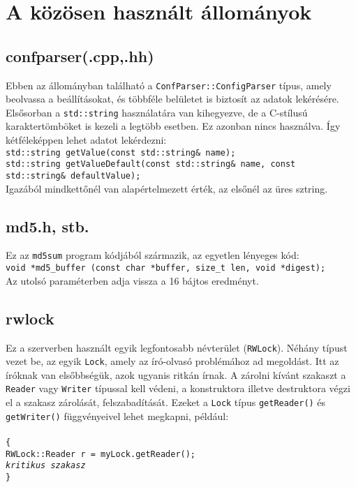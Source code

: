 \documentclass[fleqn,10pt,a4paper,titlepage]{article}
\begin{document}
  \section{A közösen használt állományok}
  
  \subsection{confparser(.cpp,.hh)}
  Ebben az állományban található a \texttt{ConfParser::ConfigParser} típus, amely beolvassa a beállításokat, és többféle
  belületet is biztosít az adatok lekérésére. Elsősorban a \texttt{std::string} használatára van kihegyezve, de a
  C-stílusú karaktertömböket is kezeli a legtöbb esetben. Ez azonban nincs használva. Így kétféleképpen lehet adatot
  lekérdezni:\\
  \texttt{std::string getValue(const std::string\& name);\\
    std::string getValueDefault(const std::string\& name, const std::string\& defaultValue);\\
  }
  Igazából mindkettőnél van alapértelmezett érték, az elsőnél az üres sztring.
  
  \subsection{md5.h, stb.}
  Ez az \texttt{md5sum} program kódjából származik, az egyetlen lényeges kód:\\
  \texttt{void *md5\_buffer (const char *buffer, size\_t len, void *digest);}\\
  Az utolsó paraméterben adja vissza a 16 bájtos eredményt.

  \subsection{rwlock}
  Ez a szerverben használt egyik legfontosabb névterület (\texttt{RWLock}). Néhány típust vezet be, az egyik
  \texttt{Lock}, amely az író-olvasó problémához ad megoldást. Itt az íróknak van elsőbbségük, azok ugyanis ritkán
  írnak.
  A zárolni kívánt szakaszt a \texttt{Reader} vagy \texttt{Writer} típussal kell védeni, a konstruktora illetve
  destruktora végzi el a szakasz zárolását, felszabadítását. Ezeket a \texttt{Lock} típus \texttt{getReader()} és
  \texttt{getWriter()} függvényeivel lehet megkapni, például:\\\\
  \texttt{\{\\
    \hspace*{5mm}RWLock::Reader r = myLock.getReader();\\
    \hspace*{5mm}\emph{kritikus szakasz}\\
    \}\\
  }
\end{document}
